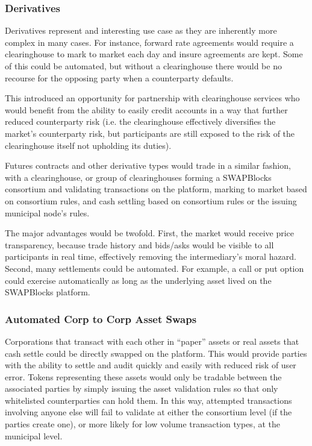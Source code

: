 \documentclass[12pt]{article}
\begin{document}
\subsubsection{Derivatives}
Derivatives represent and interesting use case as they are inherently more complex in many cases. For instance, 
forward rate agreements would require a clearinghouse to mark to market each day and insure agreements are kept. Some 
of this could be automated, but without a clearinghouse there would be no recourse for the opposing party when a 
counterparty defaults.


This introduced an opportunity for partnership with clearinghouse services who would benefit from the ability to easily 
credit accounts in a way that further reduced counterparty risk (i.e. the clearinghouse effectively diversifies the 
market’s counterparty risk, but participants are still exposed to the risk of the clearinghouse itself not 
upholding its duties).

Futures contracts and other derivative types would trade in a similar fashion, with a clearinghouse, or group of 
clearinghouses forming a SWAPBlocks consortium and validating transactions on the platform, marking to market based 
on consortium rules, and cash settling based on consortium rules or the issuing municipal node’s rules.

The major advantages would be twofold. First, the market would receive price transparency, because trade history 
and bids/asks would be visible to all participants in real time, effectively removing the intermediary’s moral 
hazard. Second, many settlements could be automated. For example, a call or put option could exercise automatically 
as long as the underlying asset lived on the SWAPBlocks platform.

\subsubsection{Automated Corp to Corp Asset Swaps}
Corporations that transact with each other in “paper” assets or real assets that cash settle could be directly 
swapped on the platform. This would provide parties with the ability to settle and audit quickly and easily with 
reduced risk of user error. Tokens representing these assets would only be tradable between the associated parties 
by simply issuing the asset validation rules so that only whitelisted counterparties can hold them. In this way, 
attempted transactions involving anyone else will fail to validate at either the consortium level (if the parties 
create one), or more likely for low volume transaction types, at the municipal level.
\end{document}
